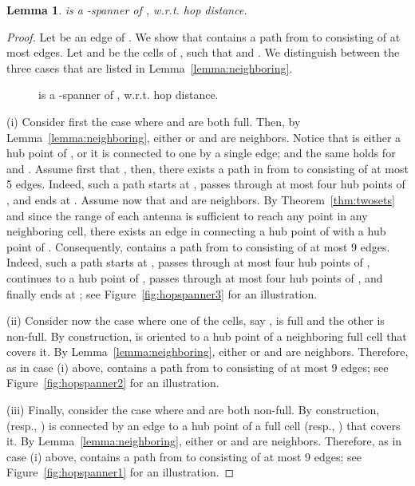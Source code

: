 \documentclass[11pt,letter]{article}
\newtheorem{lemma}[theorem]{Lemma}
\begin{document}
\begin{lemma}
\label{lemma:hop_distance}
 is a -spanner of , w.r.t. hop distance.
\end{lemma}


\begin{proof}
Let  be an edge of .
We show that  contains a path from  to  consisting of at most  edges.
Let  and  be the cells of , such that  and .
We distinguish between the three cases that are listed in Lemma~\ref{lemma:neighboring}.

\begin{figure}[htb]
 \centering
    \caption{ is a -spanner of , w.r.t. hop distance.}
\end{figure}

(i) Consider first the case where  and  are both full.
Then, by Lemma~\ref{lemma:neighboring}, either  or  and  are neighbors.
Notice that  is either a hub point of , or it is connected to one by a single edge; and the same holds for  and .
Assume first that ,
then, there exists a path in  from  to  consisting of at most 5 edges.
Indeed, such a path starts at , passes through at most four hub points of ,
and ends at .
Assume now that  and  are neighbors.
By Theorem~\ref{thm:twosets} and since the range of each antenna is sufficient to reach any point in any neighboring cell,
there exists an edge in  connecting a hub point of  with a hub point of .
Consequently,  contains a path from  to  consisting of at most 9 edges.
Indeed, such a path starts at ,
passes through at most four hub points of ,
continues to a hub point of ,
passes through at most four hub points of ,
and finally ends at ;
see Figure~\ref{fig:hopspanner3} for an illustration.

(ii) Consider now the case where one of the cells, say , is full and the other is non-full.
By construction,  is oriented to a hub point of a neighboring full cell  that covers it.
By Lemma~\ref{lemma:neighboring}, either  or  and  are neighbors.
Therefore, as in case (i) above,  contains a path from  to  consisting of at most 9 edges;
see Figure~\ref{fig:hopspanner2} for an illustration.

(iii) Finally, consider the case where  and  are both non-full.
By construction,  (resp., ) is connected by an edge to a hub point of a full cell  (resp., ) that covers it.
By Lemma~\ref{lemma:neighboring}, either  or  and  are neighbors.
Therefore, as in case (i) above,  contains a path from  to  consisting of at most 9 edges;
see Figure~\ref{fig:hopspanner1} for an illustration.
\end{proof}
\end{document}
